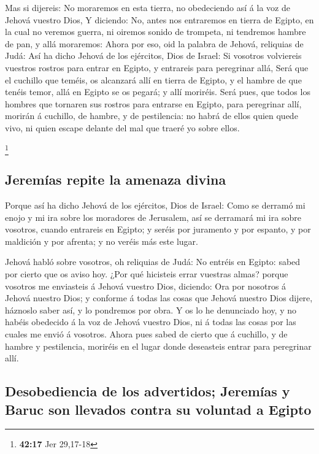  Mas si dijereis: No moraremos en esta tierra, no
obedeciendo así á la voz de Jehová vuestro Dios,  Y
diciendo: No, antes nos entraremos en tierra de Egipto, en la cual no
veremos guerra, ni oiremos sonido de trompeta, ni tendremos hambre de
pan, y allá moraremos:  Ahora por eso, oid la palabra de
Jehová, reliquias de Judá: Así ha dicho Jehová de los ejércitos, Dios de
Israel: Si vosotros volviereis vuestros rostros para entrar en Egipto, y
entrareis para peregrinar allá,  Será que el cuchillo que
teméis, os alcanzará allí en tierra de Egipto, y el hambre de que tenéis
temor, allá en Egipto se os pegará; y allí moriréis. 
Será pues, que todos los hombres que tornaren sus rostros para entrarse
en Egipto, para peregrinar allí, morirán á cuchillo, de hambre, y de
pestilencia: no habrá de ellos quien quede vivo, ni quien escape delante
del mal que traeré yo sobre ellos.

\footnote{\textbf{42:17} Jer 29,17-18}

\hypertarget{jeremuxedas-repite-la-amenaza-divina}{%
\subsection{Jeremías repite la amenaza
divina}\label{jeremuxedas-repite-la-amenaza-divina}}

 Porque así ha dicho Jehová de los ejércitos, Dios de
Israel: Como se derramó mi enojo y mi ira sobre los moradores de
Jerusalem, así se derramará mi ira sobre vosotros, cuando entrareis en
Egipto; y seréis por juramento y por espanto, y por maldición y por
afrenta; y no veréis más este lugar.

 Jehová habló sobre vosotros, oh reliquias de Judá: No
entréis en Egipto: sabed por cierto que os aviso hoy. 
¿Por qué hicisteis errar vuestras almas? porque vosotros me enviasteis á
Jehová vuestro Dios, diciendo: Ora por nosotros á Jehová nuestro Dios; y
conforme á todas las cosas que Jehová nuestro Dios dijere, háznoslo
saber así, y lo pondremos por obra.  Y os lo he
denunciado hoy, y no habéis obedecido á la voz de Jehová vuestro Dios,
ni á todas las cosas por las cuales me envió á vosotros. 
Ahora pues sabed de cierto que á cuchillo, y de hambre y pestilencia,
moriréis en el lugar donde deseasteis entrar para peregrinar allí.

\hypertarget{desobediencia-de-los-advertidos-jeremuxedas-y-baruc-son-llevados-contra-su-voluntad-a-egipto}{%
\subsection{Desobediencia de los advertidos; Jeremías y Baruc son
llevados contra su voluntad a
Egipto}\label{desobediencia-de-los-advertidos-jeremuxedas-y-baruc-son-llevados-contra-su-voluntad-a-egipto}}

